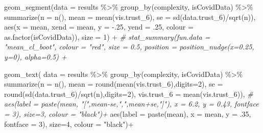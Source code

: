 \documentclass[
]{article}
\newenvironment{Shaded}{\begin{snugshade}}{\end{snugshade}}
\newcommand{\AttributeTok}[1]{\textcolor[rgb]{0.77,0.63,0.00}{#1}}
\newcommand{\CommentTok}[1]{\textcolor[rgb]{0.56,0.35,0.01}{\textit{#1}}}
\newcommand{\DecValTok}[1]{\textcolor[rgb]{0.00,0.00,0.81}{#1}}
\newcommand{\FunctionTok}[1]{\textcolor[rgb]{0.00,0.00,0.00}{#1}}
\newcommand{\NormalTok}[1]{#1}
\newcommand{\SpecialCharTok}[1]{\textcolor[rgb]{0.00,0.00,0.00}{#1}}
\newcommand{\StringTok}[1]{\textcolor[rgb]{0.31,0.60,0.02}{#1}}
\begin{document}
\begin{Shaded}
\begin{Highlighting}[]
  \FunctionTok{geom\_segment}\NormalTok{(}\AttributeTok{data =}\NormalTok{ results }\SpecialCharTok{\%\textgreater{}\%} 
                \FunctionTok{group\_by}\NormalTok{(complexity, isCovidData) }\SpecialCharTok{\%\textgreater{}\%}
                \FunctionTok{summarize}\NormalTok{(}\AttributeTok{n =} \FunctionTok{n}\NormalTok{(), }
                           \AttributeTok{mean =} \FunctionTok{mean}\NormalTok{(vis.trust\_6),}
            \AttributeTok{se =} \FunctionTok{sd}\NormalTok{(data.trust\_6)}\SpecialCharTok{/}\FunctionTok{sqrt}\NormalTok{(n)), }
              \FunctionTok{aes}\NormalTok{(}\AttributeTok{x =}\NormalTok{ mean, }\AttributeTok{xend =}\NormalTok{ mean, }\AttributeTok{y =} \SpecialCharTok{{-}}\NormalTok{.}\DecValTok{25}\NormalTok{, }\AttributeTok{yend =}\NormalTok{ .}\DecValTok{25}\NormalTok{,  }\AttributeTok{colour =} \FunctionTok{as.factor}\NormalTok{(isCovidData)), }\AttributeTok{size =} \DecValTok{1}\NormalTok{) }\SpecialCharTok{+}
        \CommentTok{\# stat\_summary(fun.data = "mean\_cl\_boot", colour = "red", size = 0.5, position = position\_nudge(x=0.25, y=0), alpha=0.5) +}

  \FunctionTok{geom\_text}\NormalTok{( }\AttributeTok{data =}\NormalTok{ results }\SpecialCharTok{\%\textgreater{}\%} 
                \FunctionTok{group\_by}\NormalTok{(complexity, isCovidData) }\SpecialCharTok{\%\textgreater{}\%}
                \FunctionTok{summarize}\NormalTok{(}\AttributeTok{n =} \FunctionTok{n}\NormalTok{(), }
                           \AttributeTok{mean =} \FunctionTok{round}\NormalTok{(}\FunctionTok{mean}\NormalTok{(vis.trust\_6),}\AttributeTok{digits=}\DecValTok{2}\NormalTok{),}
            \AttributeTok{se =} \FunctionTok{round}\NormalTok{(}\FunctionTok{sd}\NormalTok{(data.trust\_6)}\SpecialCharTok{/}\FunctionTok{sqrt}\NormalTok{(n),}\AttributeTok{digits=}\DecValTok{2}\NormalTok{),}
                          \AttributeTok{vis.trust\_6 =} \FunctionTok{mean}\NormalTok{(vis.trust\_6)),}
            \CommentTok{\# aes(label = paste(mean, "[",mean{-}se,",",mean+se,"]"), x = 6.2, y = 0.43, fontface = 3), size=3, colour = "black")+}
              \FunctionTok{aes}\NormalTok{(}\AttributeTok{label =} \FunctionTok{paste}\NormalTok{(mean), }\AttributeTok{x =}\NormalTok{ mean, }\AttributeTok{y =}\NormalTok{ .}\DecValTok{35}\NormalTok{, }\AttributeTok{fontface =} \DecValTok{3}\NormalTok{), }\AttributeTok{size=}\DecValTok{4}\NormalTok{, }\AttributeTok{colour =} \StringTok{"black"}\NormalTok{)}\SpecialCharTok{+}


\end{Highlighting}
\end{Shaded}
\end{document}
